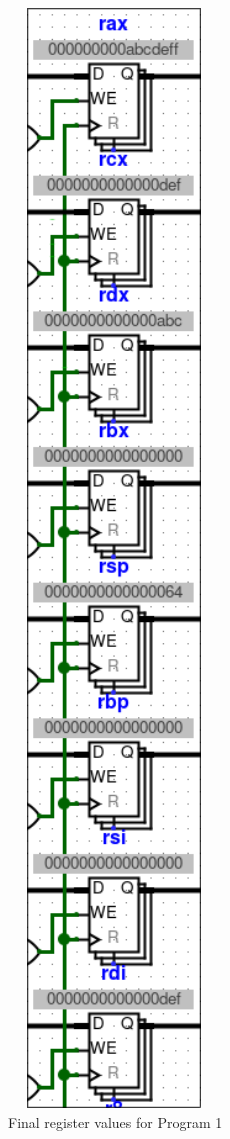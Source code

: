\documentclass{article}
\begin{document}
\begin{minipage}{0.5\textwidth}
    \begin{figure}[H]
        \centering
        \includegraphics[width=0.5\textwidth]{./images/test1_reg1.png}
        \caption{Final register values for Program 1}
    \end{figure}
\end{minipage}
\end{document}

